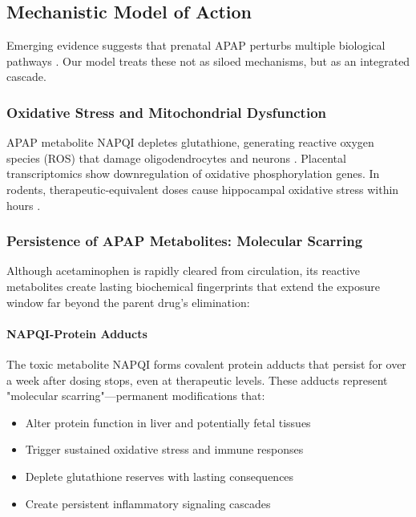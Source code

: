 \documentclass[11pt]{article}
\let\oldsubsection\subsection
\renewcommand{\subsection}[1]{\oldsubsection{#1}\setlength{\leftskip}{0.75em}}
\let\oldsubsubsection\subsubsection
\renewcommand{\subsubsection}[1]{\oldsubsubsection{#1}\setlength{\leftskip}{1.5em}}
\begin{document}
\subsection{Mechanistic Model of Action}
Emerging evidence suggests that prenatal APAP perturbs multiple biological pathways \citep{baker2020,kristensen2016,zhu2021}. Our model treats these not as siloed mechanisms, but as an integrated cascade.

\subsubsection{Oxidative Stress and Mitochondrial Dysfunction}
APAP metabolite NAPQI depletes glutathione, generating reactive oxygen species (ROS) that damage oligodendrocytes and neurons \citep{parker2020,posadas2019}. Placental transcriptomics show downregulation of oxidative phosphorylation genes. In rodents, therapeutic-equivalent doses cause hippocampal oxidative stress within hours \citep{philippot2022,riffel2020}.

\subsubsection{Persistence of APAP Metabolites: Molecular Scarring}

Although acetaminophen is rapidly cleared from circulation, its reactive metabolites create lasting biochemical fingerprints that extend the exposure window far beyond the parent drug's elimination:

\paragraph{NAPQI-Protein Adducts}
The toxic metabolite NAPQI forms covalent protein adducts that persist for over a week after dosing stops, even at therapeutic levels. These adducts represent "molecular scarring"—permanent modifications that:
\begin{itemize}
\item Alter protein function in liver and potentially fetal tissues
\item Trigger sustained oxidative stress and immune responses
\item Deplete glutathione reserves with lasting consequences
\item Create persistent inflammatory signaling cascades
\end{itemize}
\end{document}
